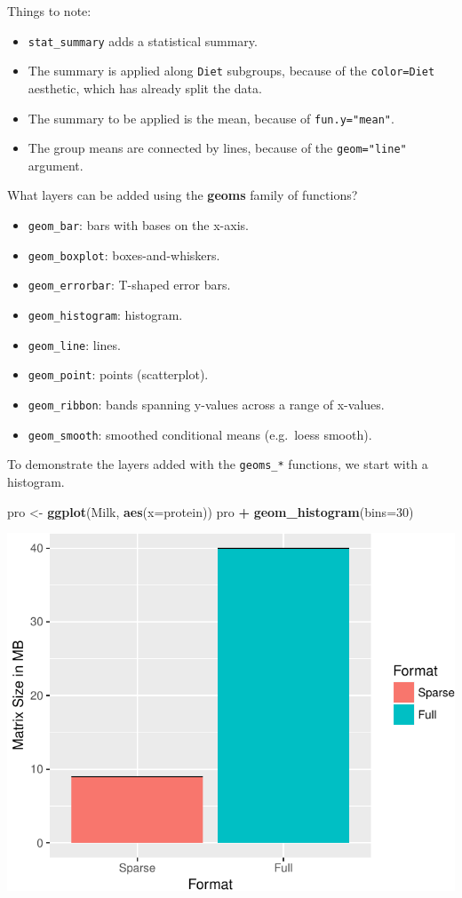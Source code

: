 \documentclass[]{book}
\newenvironment{Shaded}{\begin{snugshade}}{\end{snugshade}}
\newcommand{\DataTypeTok}[1]{\textcolor[rgb]{0.13,0.29,0.53}{#1}}
\newcommand{\DecValTok}[1]{\textcolor[rgb]{0.00,0.00,0.81}{#1}}
\newcommand{\KeywordTok}[1]{\textcolor[rgb]{0.13,0.29,0.53}{\textbf{#1}}}
\newcommand{\NormalTok}[1]{#1}
\newcommand{\OperatorTok}[1]{\textcolor[rgb]{0.81,0.36,0.00}{\textbf{#1}}}
\newcommand{\StringTok}[1]{\textcolor[rgb]{0.31,0.60,0.02}{#1}}
\providecommand{\tightlist}{%
  \setlength{\itemsep}{0pt}\setlength{\parskip}{0pt}}
\theoremstyle{definition}
\theoremstyle{definition}
\theoremstyle{definition}
\theoremstyle{remark}
\begin{document}
Things to note:

\begin{itemize}
\tightlist
\item
  \texttt{stat\_summary} adds a statistical summary.
\item
  The summary is applied along \texttt{Diet} subgroups, because of the \texttt{color=Diet} aesthetic, which has already split the data.
\item
  The summary to be applied is the mean, because of \texttt{fun.y="mean"}.
\item
  The group means are connected by lines, because of the \texttt{geom="line"} argument.
\end{itemize}

What layers can be added using the \textbf{geoms} family of functions?

\begin{itemize}
\tightlist
\item
  \texttt{geom\_bar}: bars with bases on the x-axis.
\item
  \texttt{geom\_boxplot}: boxes-and-whiskers.
\item
  \texttt{geom\_errorbar}: T-shaped error bars.
\item
  \texttt{geom\_histogram}: histogram.
\item
  \texttt{geom\_line}: lines.
\item
  \texttt{geom\_point}: points (scatterplot).
\item
  \texttt{geom\_ribbon}: bands spanning y-values across a range of x-values.
\item
  \texttt{geom\_smooth}: smoothed conditional means (e.g.~loess smooth).
\end{itemize}

To demonstrate the layers added with the \texttt{geoms\_*} functions, we start with a histogram.

\begin{Shaded}
\begin{Highlighting}[]
\NormalTok{pro <-}\StringTok{ }\KeywordTok{ggplot}\NormalTok{(Milk, }\KeywordTok{aes}\NormalTok{(}\DataTypeTok{x=}\NormalTok{protein))}
\NormalTok{pro }\OperatorTok{+}\StringTok{ }\KeywordTok{geom_histogram}\NormalTok{(}\DataTypeTok{bins=}\DecValTok{30}\NormalTok{)}
\end{Highlighting}
\end{Shaded}

\includegraphics[width=0.5\linewidth]{Rcourse_files/figure-latex/unnamed-chunk-276-1}
\end{document}
